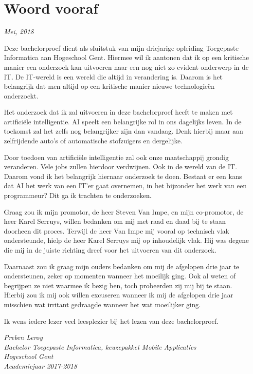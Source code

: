 
\chapter*{Woord vooraf}
\label{ch:voorwoord}

\begin{flushright}
	\textit{Mei, 2018}
\end{flushright}

Deze bachelorproef dient als sluitstuk van mijn driejarige opleiding Toegepaste Informatica aan Hogeschool Gent. Hiermee wil ik aantonen dat ik op een kritische manier een onderzoek kan uitvoeren naar een nog niet zo evident onderwerp in de IT. De IT-wereld is een wereld die altijd in verandering is. Daarom is het belangrijk dat men altijd op een kritische manier nieuwe technologieën onderzoekt.

Het onderzoek dat ik zal uitvoeren in deze bachelorproef heeft te maken met artificiële intelligentie. AI speelt een belangrijke rol in ons dagelijks leven. In de toekomst zal het zelfs nog belangrijker zijn dan vandaag. Denk hierbij maar aan zelfrijdende auto's of automatische stofzuigers en dergelijke. 

Door toedoen van artificiële intelligentie zal ook onze maatschappij grondig veranderen. Vele jobs zullen hierdoor verdwijnen. Ook in de wereld van de IT. Daarom vond ik het belangrijk hiernaar onderzoek te doen. Bestaat er een kans dat AI het werk van een IT'er gaat overnemen, in het bijzonder het werk van een programmeur? Dit ga ik trachten te onderzoeken. 

Graag zou ik mijn promotor, de heer Steven Van Impe, en mijn co-promotor, de heer Karel Serruys, willen bedanken om mij met raad en daad bij te staan doorheen dit proces. Terwijl de heer Van Impe mij vooral op technisch vlak ondersteunde, hielp de heer Karel Serruys mij op inhoudelijk vlak. Hij was degene die mij in de juiste richting dreef voor het uitvoeren van dit onderzoek.

\break
Daarnaast zou ik graag mijn ouders bedanken om mij de afgelopen drie jaar te ondersteunen, zeker op momenten wanneer het moeilijk ging. Ook al weten of begrijpen ze niet waarmee ik bezig ben, toch probeerden zij mij bij te staan. Hierbij zou ik mij ook willen excuseren wanneer ik mij de afgelopen drie jaar misschien wat irritant gedraagde wanneer het wat moeilijker ging. 

Ik wens iedere lezer veel leesplezier bij het lezen van deze bachelorproef.

\begin{flushright}
	\textit{Preben Leroy \\
		Bachelor Toegepaste Informatica, keuzepakket Mobile Applicaties \\
		Hogeschool Gent \\
		Academiejaar 2017-2018}
\end{flushright}